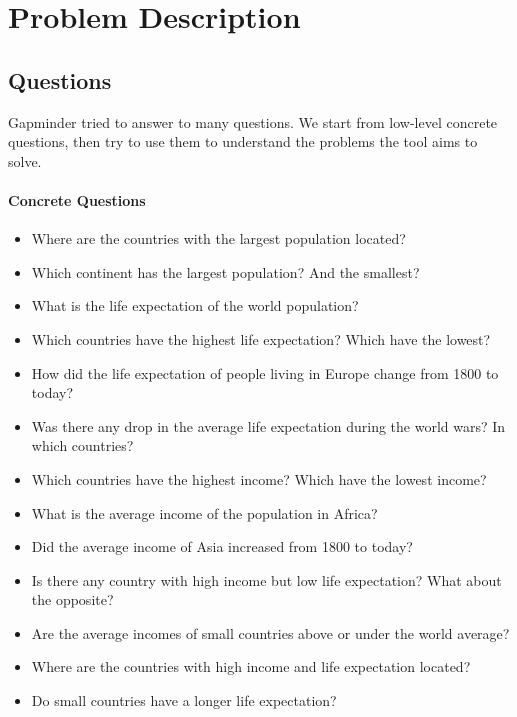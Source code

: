 \section{Problem Description}
\label{sec:problem}

\subsection{Questions}
Gapminder tried to answer to many questions.
We start from low-level concrete questions, then try to use them to understand the problems the tool aims to solve. 

\pagebreak

\paragraph{Concrete Questions}
\begin{itemize}

    \item Where are the countries with the largest population located?
    \item Which continent has the largest population? And the smallest?

    \item What is the life expectation of the world population?
    \item Which countries have the highest life expectation? Which have the lowest?
    \item How did the life expectation of people living in Europe change from 1800 to today?
    \item Was there any drop in the average life expectation during the world wars? In which countries?

    \item Which countries have the highest income? Which have the lowest income?
    \item What is the average income of the population in Africa?
    \item Did the average income of Asia increased from 1800 to today?  

    \item Is there any country with high income but low life expectation? What about the opposite?
    \item Are the average incomes of small countries above or under the world average?
    \item Where are the countries with high income and life expectation located?
    \item Do small countries have a longer life expectation?

\end{itemize}

